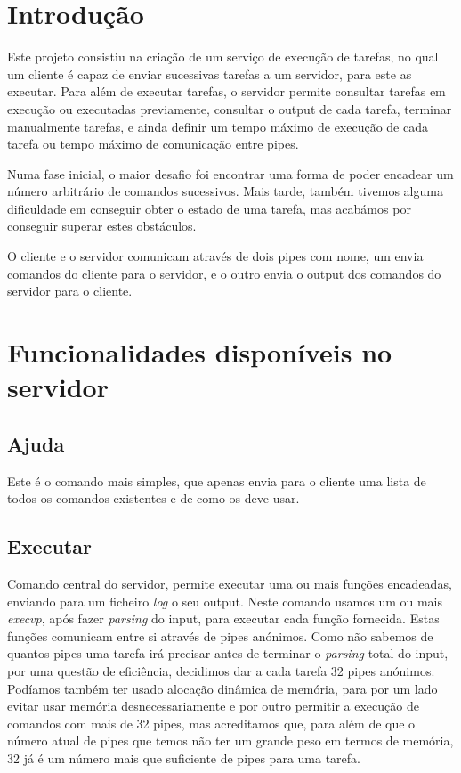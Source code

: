 \documentclass[a4paper]{report}
\begin{document}
	\tableofcontents
	
	\pagebreak
	
	\chapter{Introdução}
%	
	Este projeto consistiu na criação de um serviço de execução de tarefas, no qual um cliente é capaz de enviar sucessivas tarefas a um servidor, para este as executar.
	Para além de executar tarefas, o servidor permite consultar tarefas em execução ou executadas previamente, consultar o output de cada tarefa, terminar manualmente tarefas, e ainda definir um tempo máximo de execução de cada tarefa ou tempo máximo de comunicação entre pipes.
	
	Numa fase inicial, o maior desafio foi encontrar uma forma de poder encadear um número arbitrário de comandos sucessivos. Mais tarde, também tivemos alguma dificuldade em conseguir obter o estado de uma tarefa, mas acabámos por conseguir superar estes obstáculos.
	
	O cliente e o servidor comunicam através de dois pipes com nome, um envia comandos do cliente para o servidor, e o outro envia o output dos comandos do servidor para o cliente.
	
	\chapter{Funcionalidades disponíveis no servidor}
	\section{Ajuda}
	Este é o comando mais simples, que apenas envia para o cliente uma lista de todos os comandos existentes e de como os deve usar.
	
	\section{Executar}
	Comando central do servidor, permite executar uma ou mais funções encadeadas, enviando para um ficheiro \emph{log} o seu output. Neste comando usamos um ou mais \emph{execvp}, após fazer \textit{parsing} do input, para executar cada função fornecida. Estas funções comunicam entre si através de pipes anónimos. Como não sabemos de quantos pipes uma tarefa irá precisar antes de terminar o \textit{parsing} total do input, por uma questão de eficiência, decidimos dar a cada tarefa 32 pipes anónimos. Podíamos também ter usado alocação dinâmica de memória, para por um lado evitar usar memória desnecessariamente e por outro permitir a execução de comandos com mais de 32 pipes, mas acreditamos que, para além de que o número atual de pipes que temos não ter um grande peso em termos de memória, 32 já é um número mais que suficiente de pipes para uma tarefa.
\end{document}
